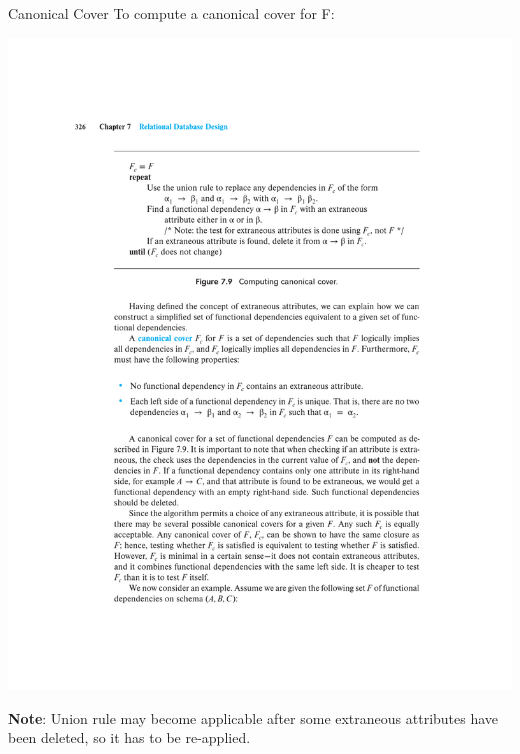 \documentclass{beamer}
\begin{document}
\begin{frame}{Canonical Cover}
    To compute a canonical cover for F:
    \begin{center}
        \includegraphics[width=\textwidth, trim={3.5cm 17cm 3.5cm 4.5cm}, clip]{figures/p326_Canonical}
    \end{center}
    \textbf{Note}: Union rule may become applicable after some extraneous attributes have been deleted, so it has to be re-applied.
\end{frame}
\end{document}
